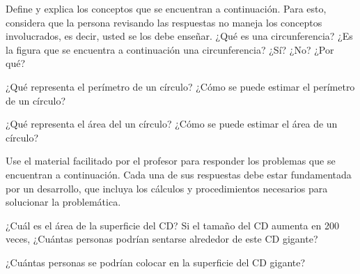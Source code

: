 \documentclass{DivinaPastora}
\begin{document}
\parte Define y explica los conceptos que se encuentran a continuación. 
Para esto, considera que la persona revisando las respuestas no maneja los 
conceptos involucrados, es decir, usted se los debe enseñar.
%
%
\pregunta ¿Qué es una circunferencia?  
¿Es la figura que se encuentra a continuación una circunferencia? ¿Sí? ¿No? ¿Por qué? 
\begin{center}
\end{center}
\respuesta[5]

\pregunta ¿Qué representa el perímetro de un círculo? ¿Cómo se puede estimar 
el perímetro de un círculo?
\respuesta[5]

\pregunta ¿Qué representa el área del un círculo? ¿Cómo se puede estimar el 
área de un círculo?  %
\respuesta[5]

\parte Use el material facilitado por el profesor para responder los problemas 
que se encuentran a continuación. Cada una de sus respuestas debe estar 
fundamentada por un desarrollo, que incluya los cálculos y procedimientos necesarios 
para solucionar la problemática.
%

\pregunta ¿Cuál es el área de la superficie del CD?
\desarrollo[5]
\respuesta[2]
\pregunta Si el tamaño del CD aumenta en 200 veces, ¿Cuántas personas 
podrían sentarse alrededor de este CD gigante?
\desarrollo[7]
\respuesta[5]

\pregunta ¿Cuántas personas se podrían 
colocar en la superficie del CD gigante?
\desarrollo[7]
\respuesta[5]

\vspace{3cm}\hspace{11cm}

\end{document}
